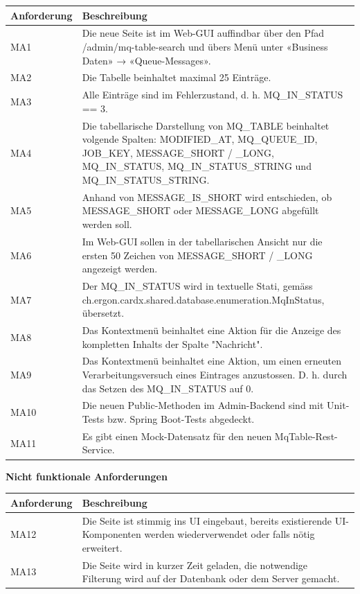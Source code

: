 \noindent \begin{tabular}{|p{3cm}|p{12cm}|}
	\hline
	\textbf{Anforderung}  & \textbf{Beschreibung} \\ \hline
	MA1    & Die neue Seite ist im Web-GUI auffindbar über den Pfad /admin/mq-table-search und übers Menü unter «Business Daten» → «Queue-Messages».     \\ \hline
	MA2    & Die Tabelle beinhaltet maximal 25 Einträge.     \\ \hline
	MA3    & Alle Einträge sind im Fehlerzustand, d. h. MQ\_IN\_STATUS == 3.     \\ \hline
	MA4    & Die tabellarische Darstellung von MQ\_TABLE beinhaltet volgende Spalten: MODIFIED\_AT, MQ\_QUEUE\_ID, JOB\_KEY, MESSAGE\_SHORT / \_LONG, MQ\_IN\_STATUS, MQ\_IN\_STATUS\_STRING und MQ\_IN\_STATUS\_STRING.    \\ \hline
	MA5    & Anhand von MESSAGE\_IS\_SHORT wird entschieden, ob MESSAGE\_SHORT oder MESSAGE\_LONG abgefüllt werden soll.     \\ \hline
	MA6    & Im Web-GUI sollen in der tabellarischen Ansicht nur die ersten 50 Zeichen von MESSAGE\_SHORT / \_LONG angezeigt werden.     \\ \hline
	MA7    & Der MQ\_IN\_STATUS wird in textuelle Stati, gemäss ch.ergon.cardx.shared.database.enumeration.MqInStatus, übersetzt.      \\ \hline
	MA8    & Das Kontextmenü beinhaltet eine Aktion für die Anzeige des kompletten Inhalts der Spalte "Nachricht".     \\ \hline
	MA9    & Das Kontextmenü beinhaltet eine Aktion, um einen erneuten Verarbeitungsversuch eines Eintrages anzustossen. D. h. durch das Setzen des MQ\_IN\_STATUS auf 0.     \\ \hline
	MA10    & Die neuen Public-Methoden im Admin-Backend sind mit Unit-Tests bzw. Spring Boot-Tests abgedeckt.     \\ \hline
	MA11    & Es gibt einen Mock-Datensatz für den neuen MqTable-Rest-Service.     \\ \hline
\end{tabular}\newline

\noindent \textbf{Nicht funktionale Anforderungen}\newline

\noindent \begin{tabular}{|p{3cm}|p{12cm}|}
	\hline
	\textbf{Anforderung}  & \textbf{Beschreibung} \\ \hline
	MA12    & Die Seite ist stimmig ins UI eingebaut, bereits existierende UI-Komponenten werden wiederverwendet oder falls nötig erweitert.     \\ \hline
	MA13    & Die Seite wird in kurzer Zeit geladen, die notwendige Filterung wird auf der Datenbank oder dem Server gemacht.     \\ \hline
\end{tabular}

